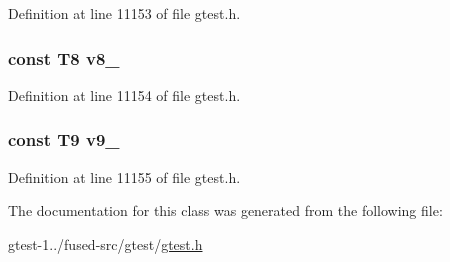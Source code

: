 \-Definition at line 11153 of file gtest.\-h.

\hypertarget{classtesting_1_1internal_1_1ValueArray18_a596bc5260b2474271d1f6910ff6f665d}{
\subsubsection[{v8\-\_\-}]{\setlength{\rightskip}{0pt plus 5cm}const \-T8 {\bf v8\-\_\-}}}\label{d3/d7b/classtesting_1_1internal_1_1ValueArray18_a596bc5260b2474271d1f6910ff6f665d}


\-Definition at line 11154 of file gtest.\-h.

\hypertarget{classtesting_1_1internal_1_1ValueArray18_a6356e16cf54a9dfac8525f20242af31e}{
\subsubsection[{v9\-\_\-}]{\setlength{\rightskip}{0pt plus 5cm}const \-T9 {\bf v9\-\_\-}}}\label{d3/d7b/classtesting_1_1internal_1_1ValueArray18_a6356e16cf54a9dfac8525f20242af31e}


\-Definition at line 11155 of file gtest.\-h.



\-The documentation for this class was generated from the following file\-:\begin{DoxyCompactItemize}
\item 
gtest-\/1../fused-\/src/gtest/\hyperlink{fused-src_2gtest_2gtest_8h}{gtest.\-h}\end{DoxyCompactItemize}
